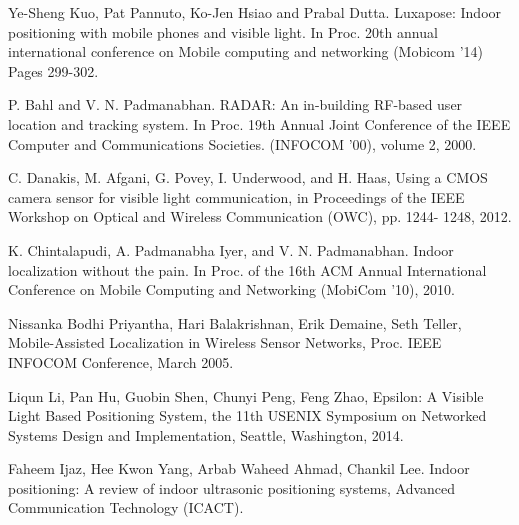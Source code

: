 \documentclass[conference]{IEEEtran}
\begin{document}

%
%
%
\begin{thebibliography}{1}

Ye-Sheng Kuo, Pat Pannuto, Ko-Jen Hsiao and Prabal Dutta. Luxapose: Indoor positioning with mobile phones and visible light. In Proc. 20th annual international conference on Mobile computing and networking (Mobicom ’14)
Pages 299-302.

P. Bahl and V. N. Padmanabhan. RADAR: An in-building
RF-based user location and tracking system. In Proc. 19th
Annual Joint Conference of the IEEE Computer and
Communications Societies. (INFOCOM ’00), volume 2, 2000.

C. Danakis, M. Afgani, G. Povey, I. Underwood, and H. Haas, Using a CMOS camera sensor for visible light
communication, in Proceedings of the IEEE Workshop on Optical and Wireless Communication (OWC), pp. 1244-
1248, 2012.

K. Chintalapudi, A. Padmanabha Iyer, and V. N.
Padmanabhan. Indoor localization without the pain. In Proc.
of the 16th ACM Annual International Conference on Mobile
Computing and Networking (MobiCom ’10), 2010.

Nissanka Bodhi Priyantha, Hari Balakrishnan, Erik Demaine, Seth Teller, Mobile-Assisted Localization in Wireless Sensor Networks, Proc. IEEE INFOCOM Conference, March 2005.

Liqun Li, Pan Hu, Guobin Shen, Chunyi Peng, Feng Zhao, Epsilon: A Visible Light Based Positioning System, the 11th USENIX Symposium on Networked Systems Design and Implementation, Seattle, Washington, 2014.

Faheem Ijaz, Hee Kwon Yang, Arbab Waheed Ahmad, Chankil Lee. Indoor positioning: A review of indoor ultrasonic positioning systems, Advanced Communication Technology (ICACT).



\end{thebibliography}
\end{document}
